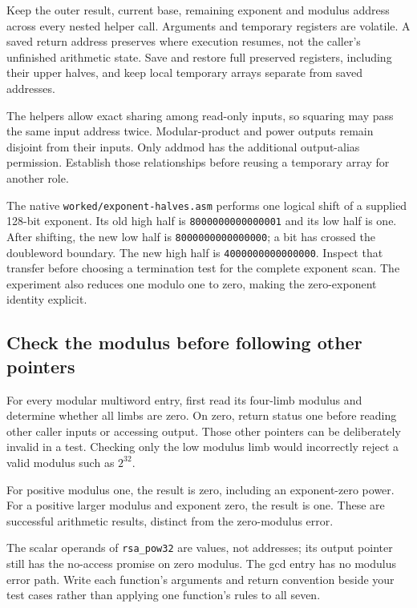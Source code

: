 Keep the outer result, current base, remaining exponent and modulus address
across every nested helper call. Arguments and temporary registers are volatile.
A saved return address preserves where execution resumes, not the caller's
unfinished arithmetic state. Save and restore full preserved registers, including
their upper halves, and keep local temporary arrays separate from saved addresses.

The helpers allow exact sharing among read-only inputs, so squaring may pass the
same input address twice. Modular-product and power outputs remain disjoint from
their inputs. Only addmod has the additional output-alias permission. Establish
those relationships before reusing a temporary array for another role.

The native \texttt{worked/exponent-halves.asm} performs one logical shift
of a supplied 128-bit exponent. Its old high half is
\texttt{8000000000000001} and its low half is one. After shifting, the new low
half is \texttt{8000000000000000}; a bit has crossed the doubleword boundary.
The new high half is \texttt{4000000000000000}. Inspect that transfer before
choosing a termination test for the complete exponent scan. The experiment also
reduces one modulo one to zero, making the zero-exponent identity explicit.

\subsection*{Check the modulus before following other pointers}

For every modular multiword entry, first read its four-limb modulus and determine
whether all limbs are zero. On zero, return status one before reading other caller
inputs or accessing output. Those other pointers can be deliberately invalid in
a test. Checking only the low modulus limb would incorrectly reject a valid
modulus such as $2^{32}$.

For positive modulus one, the result is zero, including an exponent-zero power.
For a positive larger modulus and exponent zero, the result is one. These are
successful arithmetic results, distinct from the zero-modulus error.

The scalar operands of \texttt{rsa\_pow32} are values, not addresses; its output
pointer still has the no-access promise on zero modulus. The gcd entry has no
modulus error path. Write each function's arguments and return convention beside
your test cases rather than applying one function's rules to all seven.

